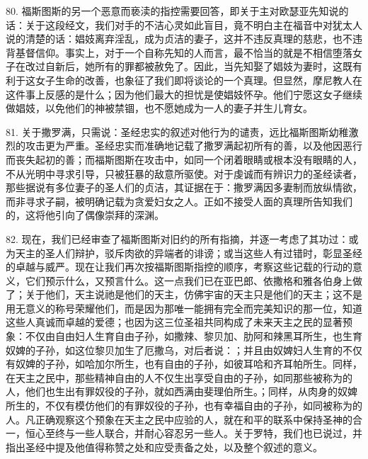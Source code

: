 80. 福斯图斯的另一个恶意而亵渎的指控需要回答，即关于主对欧瑟亚先知说的话：关于这段经文，我们对手的不洁心灵如此盲目，竟不明白主在福音中对犹太人说的清楚的话：娼妓离弃淫乱，成为贞洁的妻子，这并不违反真理的慈悲，也不违背基督信仰。事实上，对于一个自称先知的人而言，最不恰当的就是不相信堕落女子在改过自新后，她所有的罪都被赦免了。因此，当先知娶了娼妓为妻时，这既有利于这女子生命的改善，也象征了我们即将谈论的一个真理。但显然，摩尼教人在这件事上反感的是什么；因为他们最大的担忧是使娼妓怀孕。他们宁愿这女子继续做娼妓，以免他们的神被禁锢，也不愿她成为一人的妻子并生儿育女。\par

81. 关于撒罗满，只需说：圣经忠实的叙述对他行为的谴责，远比福斯图斯幼稚激烈的攻击更为严重。圣经忠实而准确地记载了撒罗满起初所有的善，以及他因恶行而丧失起初的善；而福斯图斯在攻击中，如同一个闭着眼睛或根本没有眼睛的人，不从光明中寻求引导，只被狂暴的敌意所驱使。对于虔诚而有辨识力的圣经读者，那些据说有多位妻子的圣人们的贞洁，其证据在于：撒罗满因多妻制而放纵情欲，而非寻求子嗣，被明确记载为贪爱妇女之人。正如不接受人面的真理所告知我们的，这将他引向了偶像崇拜的深渊。\par

82. 现在，我们已经审查了福斯图斯对旧约的所有指摘，并逐一考虑了其功过：或为天主的圣人们辩护，驳斥肉欲的异端者的诽谤；或当这些人有过错时，彰显圣经的卓越与威严。现在让我们再次按福斯图斯指控的顺序，考察这些记载的行动的意义，它们预示什么，又预言什么。这一点我们已在亚巴郎、依撒格和雅各伯身上做了；关于他们，天主说祂是他们的天主，仿佛宇宙的天主只是他们的天主；这不是用无意义的称号荣耀他们，而是因为那唯一能拥有完全而完美知识的那一位，知道这些人真诚而卓越的爱德；也因为这三位圣祖共同构成了未来天主之民的显著预象：不仅由自由妇人生育自由子孙，如撒辣、黎贝加、肋阿和辣黑耳所生，也生育奴婢的子孙，如这位黎贝加生了厄撒乌，对后者说：；并且由奴婢妇人生育的不仅有奴婢的子孙，如哈加尔所生，也有自由的子孙，如彼耳哈和齐耳帕所生。同样，在天主之民中，那些精神自由的人不仅生出享受自由的子孙，如同那些被称为的人，他们也生出有罪奴役的子孙，就如西满由斐理伯所生。；同样，从肉身的奴婢所生的，不仅有模仿他们的有罪奴役的子孙，也有幸福自由的子孙，如同被称为的人。凡正确观察这个预象在天主之民中应验的人，就在和平的联系中保持圣神的合一，恒心至终与一些人联合，并耐心容忍另一些人。关于罗特，我们也已说过，并指出圣经中提及他值得称赞之处和应受责备之处，以及整个叙述的意义。\par


